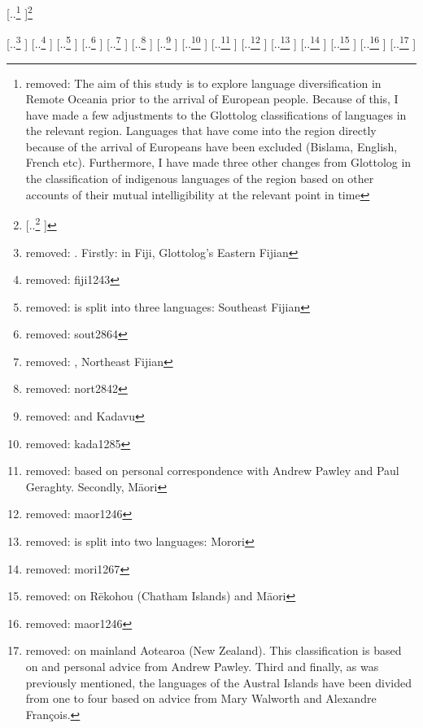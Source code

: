 \documentclass[unnumsec,webpdf,modern,medium]{oup-authoring-template}
\providecommand{\DIFdeltex}[1]{{\protect\color{red} [..\footnote{removed: #1} ]}} %
\providecommand{\DIFdelbegin}{} %
\providecommand{\DIFdelend}{} %
\providecommand{\DIFdel}[1]{\texorpdfstring{\DIFdeltex{#1}}{}} %
\newcommand{\DIFscaledelfig}{0.5}
\newlength{\DIFdelgraphicswidth} %
\newlength{\DIFdelgraphicsheight} %
\newcommand{\DIFdelincludegraphics}[2][]{%
\sbox{\DIFdelgraphicsbox}{\DIFOincludegraphics[#1]{#2}}%
\settoboxwidth{\DIFdelgraphicswidth}{\DIFdelgraphicsbox} %
\settoboxtotalheight{\DIFdelgraphicsheight}{\DIFdelgraphicsbox} %
\scalebox{\DIFscaledelfig}{%
\parbox[b]{\DIFdelgraphicswidth}{\usebox{\DIFdelgraphicsbox}\\[-\baselineskip] \rule{\DIFdelgraphicswidth}{0em}}\llap{\resizebox{\DIFdelgraphicswidth}{\DIFdelgraphicsheight}{%
\setlength{\unitlength}{\DIFdelgraphicswidth}%
\begin{picture}(1,1)%
\thicklines\linethickness{2pt} %
{\color[rgb]{1,0,0}\put(0,0){\framebox(1,1){}}}%
{\color[rgb]{1,0,0}\put(0,0){\line( 1,1){1}}}%
{\color[rgb]{1,0,0}\put(0,1){\line(1,-1){1}}}%
\end{picture}%
}\hspace*{3pt}}} %
} %
\DeclareRobustCommand{\DIFdelbegin}{\DIFOdelbegin \let\includegraphics\DIFdelincludegraphics} %
\DeclareRobustCommand{\DIFdelend}{\DIFOaddend \let\includegraphics\DIFOincludegraphics} %
\begin{document}
\DIFdelbegin \DIFdel{The aim of this study is to explore language diversification in Remote Oceania prior to the arrival of European people. Because of this, I have made a few adjustments to the Glottolog classifications of languages in the relevant region. Languages that have come into the region directly because of the arrival of Europeans have been excluded (Bislama, English, French etc). Furthermore, I have made three other changes from Glottolog in the classification of indigenous languages of the region based on other accounts of their mutual intelligibility at the relevant point in time}\footnote{\DIFdel{Tahitianization and dialect/language levelling has occurred, and therefore languages that used to be more different from each other are now more similar.}}%
\addtocounter{footnote}{-1}%
\DIFdel{. Firstly: in Fiji, Glottolog's Eastern Fijian }%
\DIFdel{fiji1243}%
\DIFdel{is split into three languages: Southeast Fijian }%
\DIFdel{sout2864}%
\DIFdel{, Northeast Fijian }%
\DIFdel{nort2842}%
\DIFdel{and Kadavu }%
\DIFdel{kada1285}%
\DIFdel{based on personal correspondence with Andrew Pawley and Paul Geraghty. Secondly, M\={a}ori }%
\DIFdel{maor1246}%
\DIFdel{is split into two languages: Morori }%
\DIFdel{mori1267}%
\DIFdel{on R\={e}kohou (Chatham Islands) and M\={a}ori }%
\DIFdel{maor1246}%
\DIFdel{on mainland Aotearoa (New Zealand). This classification is based on \citet{harlow1973regional} and personal advice from Andrew Pawley. Third and finally, as was previously mentioned, the languages of the Austral Islands have been divided from one to four based on advice from Mary Walworth and Alexandre François.
}\DIFdelend %
\end{document}
